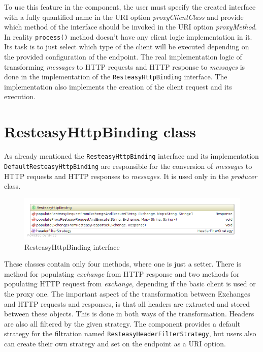 \documentclass[12pt,final,oneside]{fithesis2}
\begin{document}
To use this feature in the component, the user must specify the created interface with a fully quantified name in the URI option \textit{proxyClientClass} and provide which method of the interface should be invoked in the URI option \textit{proxyMethod}. In reality \texttt{process()} method doesn't have any client logic implementation in it. Its task is to just select which type of the client will be executed depending on the provided configuration of the endpoint. The real implementation logic of transforming \textit{messages} to HTTP requests and HTTP response to \textit{messages} is done in the implementation of the \texttt{ResteasyHttpBinding} interface. The implementation also implements the creation of the client request and its execution.




\section{ResteasyHttpBinding class}
As already mentioned the \texttt{ResteasyHttpBinding} interface and its implementation \texttt{DefaultResteasyHttpBinding} are responsible for the conversion of \textit{messages} to HTTP requests and HTTP responses to \textit{messages}. It is used only in the \textit{producer} class. 

\begin{figure}[!h]
\centering
\includegraphics[width=1.0\linewidth]{images/binding.png}
\caption{ResteasyHttpBinding interface}
\label{comp}
\end{figure}


These classes contain only four methods, where one is just a setter. There is method for populating \textit{exchange} from HTTP response and two methods for populating HTTP request from \textit{exchange}, depending if the basic client is used or the proxy one. The important aspect of the transformation between Exchanges and HTTP requests and responses, is that all headers are extracted and stored between these objects. This is done in both ways of the transformation. Headers are also all filtered by the given strategy. The component provides a default strategy for the filtration named \texttt{ResteasyHeaderFilterStrategy}, but users also can create their own strategy and set on the endpoint as a URI option.
\end{document}
